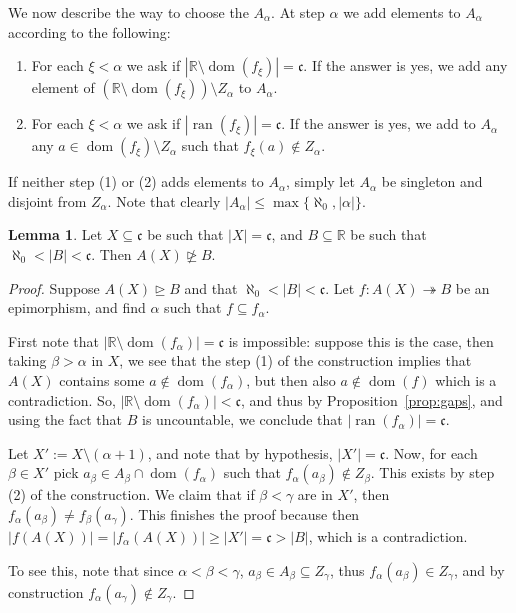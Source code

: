 \documentclass[10pt]{amsart}
\theoremstyle{definition}
\newtheorem{lemma}[theorem]{Lemma}
\theoremstyle{remark}
\newcommand{\seb}{\subseteq}
\newcommand{\setm}{\setminus}
\newcommand{\sgeq}{\trianglerighteq}
\newcommand{\nsgeq}{\ntrianglerighteq}
\newcommand{\sur}{\twoheadrightarrow}
\newcommand{\1}{\mathbbm{1}}
\newcommand{\cc}{\mathfrak{c}}
\DeclareMathOperator{\dom}{dom}
\DeclareMathOperator{\ran}{ran}
\begin{document}
We now describe the way to choose the $A_{\alpha}$.
At step $\alpha$ we add elements to $A_{\alpha}$
according to the following:
\begin{enumerate}\itemsep0em
  \item For each $\xi < \alpha$ we ask if
  $|\mathbb{R}\setm \dom(f_{\xi})| = \cc$. If the answer is yes,
  we add any element of $(\mathbb{R}\setm \dom(f_{\xi})) \setm Z_{\alpha}$
  to $A_{\alpha}$.
  \item For each $\xi < \alpha$ we ask if $|\ran(f_{\xi})| = \cc$.
  If the answer is yes, we add to $A_{\alpha}$ any
  $a \in \dom(f_{\xi}) \setm Z_{\alpha}$ such that $f_{\xi}(a) \notin Z_{\alpha}$.
\end{enumerate}
If neither step (1) or (2) adds elements to $A_{\alpha}$, simply let
$A_{\alpha}$ be singleton and disjoint from $Z_{\alpha}$. Note that clearly
$|A_{\alpha}| \le \max\{\aleph_{0},|\alpha|\}$.

\begin{lemma}
  Let $X \seb \cc$ be such that $|X| = \cc$, and
  $B \seb \mathbb{R}$ be such that $\aleph_{0} < |B| < \cc$.
  Then $A(X) \nsgeq B$.
\end{lemma}
\begin{proof}
  Suppose $A(X) \sgeq B$ and that $\aleph_{0} < |B| < \cc$. Let $f : A(X) \sur B$ be
  an epimorphism, and find $\alpha$ such that
  $f \seb f_{\alpha}$.

  First note that $|\mathbb{R} \setm \dom(f_{\alpha})| = \cc$ is impossible:
  suppose this is the case, then taking
  $\beta > \alpha$ in $X$, we see that the step (1) of the construction implies
  that $A(X)$ contains some $a \notin \dom(f_{\alpha})$,
  but then also $a \notin \dom(f)$ which is a contradiction. So,
  $|\mathbb{R} \setm \dom(f_{\alpha})| < \cc$, and thus by
  Proposition~\ref{prop:gaps}, and using the fact that $B$ is uncountable,
  we conclude that $|\ran(f_{\alpha})| = \cc$.

  Let $X' := X \setm (\alpha+1)$, and note that by hypothesis,
  $|X'| = \cc$. Now, for each $\beta \in X'$ pick
  $a_{\beta} \in A_{\beta} \cap \dom(f_{\alpha})$
  such that $f_{\alpha}(a_{\beta}) \notin Z_{\beta}$. This exists by
  step (2) of the construction. We claim that if $\beta < \gamma$
  are in $X'$, then $f_{\alpha}(a_{\beta}) \neq f_{\beta}(a_{\gamma})$.
  This finishes the proof because then
  $|f(A(X))| = |f_{\alpha}(A(X))| \ge |X'| = \cc > |B|$, which
  is a contradiction.

  To see this, note that since $\alpha < \beta < \gamma$,
  $a_{\beta} \in A_{\beta} \seb Z_{\gamma}$, thus $f_{\alpha}(a_{\beta}) \in Z_{\gamma}$,
  and by construction $f_{\alpha}(a_{\gamma}) \notin Z_{\gamma}$.
\end{proof}
\end{document}
